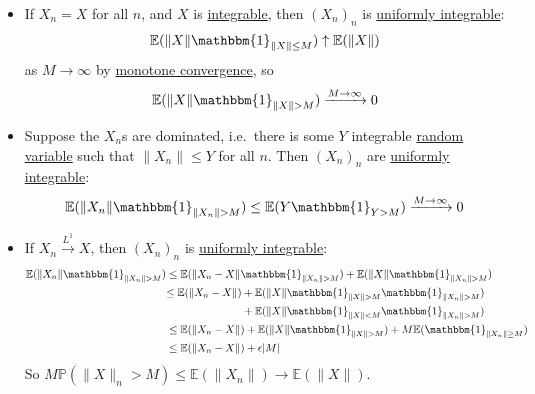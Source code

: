 \documentclass{article}
\newcommand{\1}[1]{\mathbbm{1}_{#1}}
\newcommand{\Prob}{\mathbb{P}}
\newcommand{\E}{\mathbb{E}}
\begin{document}
\begin{remark}\leavevmode
    \begin{itemize}
        \item If $X_n = X$ for all $n$, and $X$ is \hyperlink{def:integral}{integrable}, then $(X_n)_n$ is \hyperlink{def:ui}{uniformly integrable}:
            \begin{equation*}
                \E(\|X\|\1{\|X\|\leq M}) \uparrow \E(\|X\|)
            \end{equation*}
            as $M \to \infty$ by \hyperlink{def:monConv}{monotone convergence}, so
            \begin{equation*}
                \E(\|X\| \1{\|X\|> M}) \xrightarrow{M \to \infty} 0
            \end{equation*}

        \item Suppose the $X_n$s are dominated, i.e.\ there is some $Y$ integrable \hyperlink{def:rv}{random variable} such that $\|X_n\|\leq Y$ for all $n$. Then $(X_n)_n$ are \hyperlink{def:ui}{uniformly integrable}:
            \begin{equation*}
                \E(\|X_n\| \1{\|X_n\| > M}) \leq \E(Y \1{Y>M}) \xrightarrow{M \to \infty} 0
            \end{equation*}

        \item If $X_n \xrightarrow{L^1} X$, then $(X_n)_n$ is \hyperlink{def:ui}{uniformly integrable}:
            \begin{align*}
                    \E(\|X_n\|\1{\|X_n\|>M}) &\leq \E(\|X_n-X\| \1{\|X_n\|>M}) + \E(\|X\| \1{\|X_n\|>M})\\
                                             &
                    \begin{aligned}
                        \leq\E(\|X_n-X\|) &+ \E(\|X\|\1{\|X\|>M} \1{\|X_n\|>M}) \\
                                      &+ \E(\|X\| \1{\|X\| < M} \1{\|X_n\|>M})
                    \end{aligned}
                    \\
                                             &\leq \E(\|X_n-X\|) + \E(\|X\| \1{\|X\|>M}) + M\E(\1{\|X_n\| \geq M}) \\
                                             &\leq \E(\|X_n-X\|) + \epsilon|M|
            \end{align*}
            So $M \Prob(\|X\|_n > M) \leq \E(\|X_n\|) \to \E(\|X\|)$.
    \end{itemize}
\end{remark}
\end{document}
